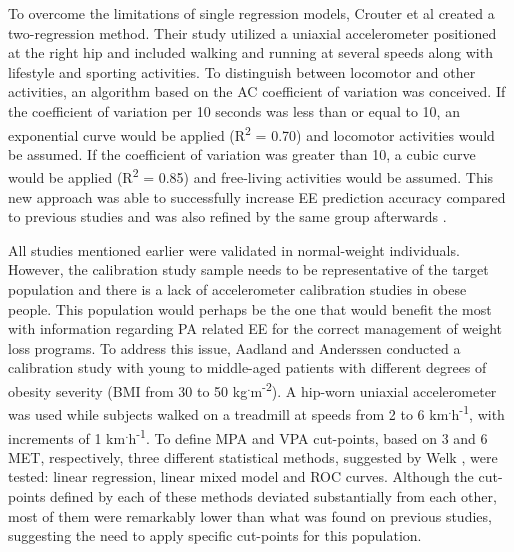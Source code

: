 \documentclass[12pt]{article}
\begin{document}
To overcome the limitations of single regression models, Crouter et al  created a two-regression method. Their study utilized a uniaxial accelerometer positioned at the right hip and included walking and running at several speeds along with lifestyle and sporting activities. To distinguish between locomotor and other activities, an algorithm based on the AC coefficient of variation was conceived. If the coefficient of variation per 10 seconds was less than or equal to 10, an exponential curve would be applied (R\textsuperscript{2} = 0.70) and locomotor activities would be assumed. If the coefficient of variation was greater than 10, a cubic curve would be applied (R\textsuperscript{2} = 0.85) and free-living activities would be assumed. This new approach was able to successfully increase EE prediction accuracy compared to previous studies and was also refined by the same group afterwards .

All studies mentioned earlier were validated in normal-weight individuals. However, the calibration study sample needs to be representative of the target population  and there is a lack of accelerometer calibration studies in obese people. This population would perhaps be the one that would benefit the most with information regarding PA related EE for the correct management of weight loss programs. To address this issue, Aadland and Anderssen  conducted a calibration study with young to middle-aged patients with different degrees of obesity severity (BMI from 30 to 50 kg\textsuperscript{.}m\textsuperscript{-2}). A hip-worn uniaxial accelerometer was used while subjects walked on a treadmill at speeds from 2 to 6 km\textsuperscript{.}h\textsuperscript{-1}, with increments of 1 km\textsuperscript{.}h\textsuperscript{-1}.  To define MPA and VPA cut-points, based on 3 and 6 MET, respectively, three different statistical methods, suggested by Welk , were tested: linear regression, linear mixed model and ROC curves. Although the cut-points defined by each of these methods deviated substantially from each other, most of them were remarkably lower than what was found on previous studies, suggesting the need to apply specific cut-points for this population.
\end{document}
